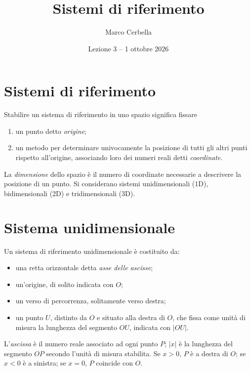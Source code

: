 \documentclass[11pt,a4paper]{article}
\title{Sistemi di riferimento}
\author{Marco Cerbella}
\date{Lezione 3 -- 1 ottobre 2026}
\begin{document}
\maketitle

\section{Sistemi di riferimento}

Stabilire un sistema di riferimento in uno spazio significa fissare
\begin{enumerate}
    \item un punto detto \emph{origine};
    \item un metodo per determinare univocamente la posizione di tutti gli altri punti rispetto all'origine, associando loro dei numeri reali detti \emph{coordinate}.
\end{enumerate}
La \emph{dimensione} dello spazio è il numero di coordinate necessarie a descrivere la posizione di un punto. Si considerano sistemi unidimensionali (1D), bidimensionali (2D) e tridimensionali (3D).

\section{Sistema unidimensionale}

Un sistema di riferimento unidimensionale è costituito da:
\begin{itemize}
    \item una retta orizzontale detta \emph{asse delle ascisse};
    \item un'origine, di solito indicata con $O$;
    \item un verso di percorrenza, solitamente verso destra;
    \item un punto $U$, distinto da $O$ e situato alla destra di $O$, che fissa come unità di misura la lunghezza del segmento $OU$, indicata con $|OU|$.
\end{itemize}
L'\emph{ascissa} è il numero reale associato ad ogni punto $P$; $|x|$ è la lunghezza del segmento $OP$ secondo l'unità di misura stabilita. Se $x > 0$, $P$ è a destra di $O$; se $x < 0$ è a sinistra; se $x = 0$, $P$ coincide con $O$.

\begin{center}
\end{center}
\end{document}
